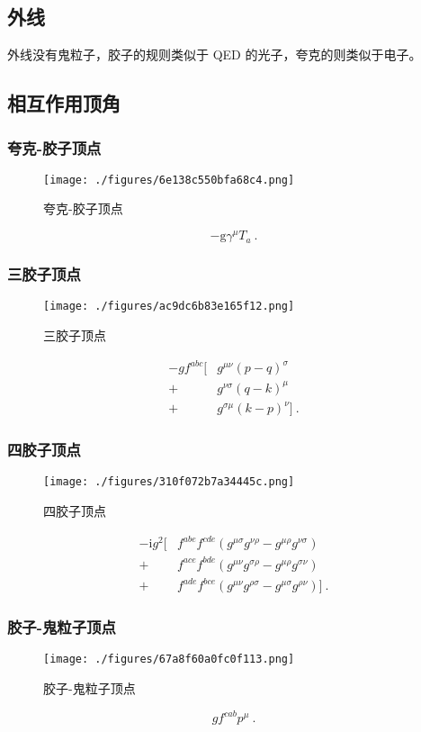 \subsection{外线}
外线没有鬼粒子，胶子的规则类似于 QED 的光子，夸克的则类似于电子。

\subsection{相互作用顶角}
\subsubsection{夸克-胶子顶点}
\begin{figure}[ht]
\centering
\texttt{[image: ./figures/6e138c550bfa68c4.png]}
\caption{夸克-胶子顶点} \label{fig_qcdfey_4}
\end{figure}
\begin{equation}
-\mathrm g \gamma^\mu T_a ~.
\end{equation}

\subsubsection{三胶子顶点}
\begin{figure}[ht]
\centering
\texttt{[image: ./figures/ac9dc6b83e165f12.png]}
\caption{三胶子顶点} \label{fig_qcdfey_5}
\end{figure}
\begin{equation}
    \begin{aligned}
		-g f^{abc}  [&g^{\mu\nu}(p-q)^\sigma \\
		+& g^{\nu\sigma} (q-k)^\mu \\
		+& g^{\sigma\mu}(k-p)^\nu] ~.
	\end{aligned}
\end{equation}

\subsubsection{四胶子顶点}
\begin{figure}[ht]
\centering
\texttt{[image: ./figures/310f072b7a34445c.png]}
\caption{四胶子顶点} \label{fig_qcdfey_6}
\end{figure}
\begin{equation}
	\begin{aligned}
		-\mathrm i g^2 [& f^{abe} f^{cde}(g^{\mu\sigma}g^{\nu\rho} - g^{\mu\rho}g^{\nu\sigma}) \\
		+& f^{ace}f^{bde}(g^{\mu\nu} g^{\sigma\rho} - g^{\mu\rho}g^{\sigma\nu}) \\
		+& f^{ade}f^{bce} (g^{\mu\nu} g^{\rho\sigma} - g^{\mu\sigma}g^{\rho\nu})] ~.
	\end{aligned}
\end{equation}

\subsubsection{胶子-鬼粒子顶点}
\begin{figure}[ht]
\centering
\texttt{[image: ./figures/67a8f60a0fc0f113.png]}
\caption{胶子-鬼粒子顶点} \label{fig_qcdfey_7}
\end{figure}
\begin{equation}
g f^{cab} p^\mu ~.
\end{equation}
